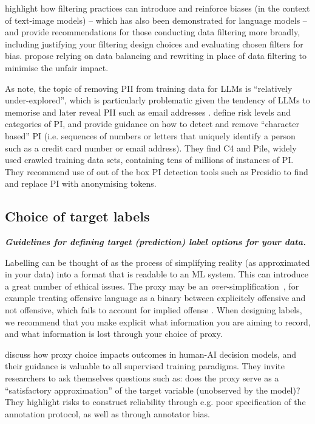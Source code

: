 \citet{hong_whos_2024} highlight how filtering practices can introduce and reinforce biases (in the context of text-image models) -- which has also been demonstrated for language models \citep{welbl_challenges_2021} -- and provide recommendations for those conducting data filtering more broadly, including justifying your filtering design choices and evaluating chosen filters for bias. \citet{anwar2024foundational} propose relying on data balancing and rewriting in place of data filtering to minimise the unfair impact.

As \citet{subramani_detecting_2023} note, the topic of removing PII from training data for LLMs is ``relatively under-explored'', which is particularly problematic given the tendency of LLMs to memorise and later reveal PII such as email addresses \citep{carlini_extracting_2021}. \citet{subramani_detecting_2023} define risk levels and categories of PI, and provide guidance on how to detect and remove ``character based'' PI (i.e. sequences of numbers or letters that uniquely identify a person such as a credit card number or email address). They find C4 and Pile, widely used crawled training data sets, containing tens of millions of instances of PI. They recommend use of out of the box PI detection tools such as Presidio to find and replace PI with anonymising tokens. 

\subsection{Choice of target labels}\noindent\textbf{\textit{Guidelines for defining target (prediction) label options for your data.}}
\newline 

\noindent Labelling can be thought of as the process of simplifying reality (as approximated in your data) into a format that is readable to an ML system. 
This can introduce a great number of ethical issues. 
The proxy may be an \emph{over}-simplification~\cite{Mulvin_Proxies_2021}, for example treating offensive language as a binary between explicitely offensive and not offensive, which fails to account for implied offense \citep[see][]{elsherief_latent_2021}. 
When designing labels, we recommend that you make explicit what information you are aiming to record, and what information is lost through your choice of proxy. 

\citet{guerdan_groundless_2023} discuss how proxy choice impacts outcomes in human-AI decision models, and their guidance is valuable to all supervised training paradigms. 
They invite researchers to ask themselves questions such as: does the proxy serve as a ``satisfactory approximation'' of the target variable (unobserved by the model)? 
They highlight risks to construct reliability through e.g. poor specification of the annotation protocol, as well as through annotator bias. 

